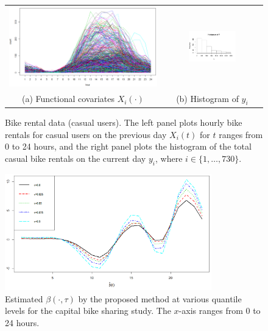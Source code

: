 \documentclass[times,sort&compress,3p]{elsarticle}
\theoremstyle{plain}%
\theoremstyle{definition}
\begin{document}
\begin{figure}
\centering 
\begin{tabular}{cc}
	\includegraphics[trim = 20 20 0 0, clip = True, width = 0.42 \textwidth]{plots/x.PNG} & 
	\includegraphics[trim = 0 40 0 52, clip = True, width = 0.5\textwidth]{plots/hist_Y.png} \\
	(a) Functional covariates $X_i(\cdot)$ & (b) Histogram of $y_i$
\end{tabular}
\caption{Bike rental data (casual users). The left panel plots hourly bike rentals for casual users on the previous day $X_i(t)$ for $t$ ranges from 0 to 24 hours, and the right panel plots the histogram of the total casual bike rentals on the current day $y_i$, where $i \in \{1, \ldots, 730\}$. } 
\label{figure:x} 
\end{figure}



\begin{figure}
\centering 
\includegraphics[trim = 0 20 0 0, clip = True, width = 0.8\textwidth]{plots/beta.png}
\caption{Estimated ${\beta}(\cdot, \tau)$ by the proposed method at various quantile levels for the capital bike sharing study. The $x$-axis ranges from 0 to 24 hours. }
\label{figure:beta.hat} 
\end{figure}
\end{document}
